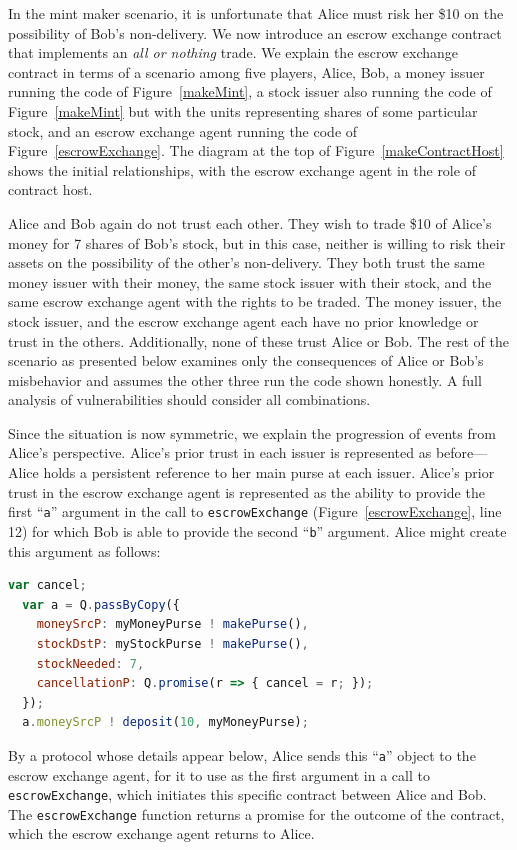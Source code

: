 \documentclass{llncs}
\begin{document}
In the mint maker scenario, it is unfortunate that Alice must risk her \$10 on the possibility of Bob's non-delivery. We now introduce an escrow exchange contract that implements an \emph{all or nothing} trade. We explain the escrow exchange contract in terms of a scenario among five players, Alice, Bob, a money issuer running the code of Figure~\ref{makeMint}, a stock issuer also running the code of Figure~\ref{makeMint} but with the units representing shares of some particular stock, and an escrow exchange agent running the code of Figure~\ref{escrowExchange}. The diagram at the top of Figure~\ref{makeContractHost} shows the initial relationships, with the escrow exchange agent in the role of contract host.

Alice and Bob again do not trust each other. They wish to trade \$10 of Alice's money for 7 shares of Bob's stock, but in this case, neither is willing to risk their assets on the possibility of the other's non-delivery. They both trust the same money issuer with their money, the same stock issuer with their stock, and the same escrow exchange agent with the rights to be traded. The money issuer, the stock issuer, and the escrow exchange agent each have no prior knowledge or trust in the others. Additionally, none of these trust Alice or Bob. The rest of the scenario as presented below examines only the consequences of Alice or Bob's misbehavior and assumes the other three run the code shown honestly. A full analysis of vulnerabilities should consider all combinations.

Since the situation is now symmetric, we explain the progression of events from Alice's perspective. Alice's prior trust in each issuer is represented as before---Alice holds a persistent reference to her main purse at each issuer. Alice's prior trust in the escrow exchange agent is represented as the ability to provide the first ``{\tt a}'' argument in the call to {\tt escrowExchange} (Figure~\ref{escrowExchange}, line 12) for which Bob is able to provide the second ``{\tt b}'' argument. Alice might create this argument as follows:

\begin{lstlisting}[language=JavaScript,numbers=none]
  var cancel;
  var a = Q.passByCopy({
    moneySrcP: myMoneyPurse ! makePurse(),
    stockDstP: myStockPurse ! makePurse(),
    stockNeeded: 7,
    cancellationP: Q.promise(r => { cancel = r; });
  });
  a.moneySrcP ! deposit(10, myMoneyPurse);
\end{lstlisting}

By a protocol whose details appear below, Alice sends this ``{\tt a}'' object to the escrow exchange agent, for it to use as the first argument in a call to {\tt escrowExchange}, which initiates this specific contract between Alice and Bob. The {\tt escrowExchange} function returns a promise for the outcome of the contract, which the escrow exchange agent returns to Alice. 
\end{document}
